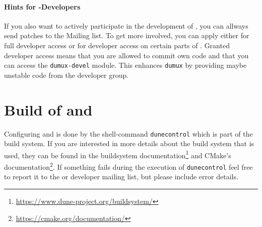 %
%
%
%

\paragraph{Hints for \Dumux-Developers}
If you also want to actively participate in the development of \Dumux, you can allways send patches
to the Mailing list.
To get more involved, you can apply either for full developer
access or for developer access on certain parts of \Dumux. Granted developer access means that
you are allowed to commit own code and that you can access the \texttt{dumux-devel} module.
This enhances \texttt{dumux} by providing maybe unstable code from the developer group.

\section{Build of \Dune and \Dumux}
\label{buildIt}
Configuring \Dune and \Dumux is done by the shell-command \texttt{dunecontrol} which is part of the \Dune build system.
If you are interested in more details about the build system that is used,
they can be found in the \Dune buildsystem documentation\footnote{\url{https://www.dune-project.org/buildsystem/}} and
CMake's documentation\footnote{\url{https://cmake.org/documentation/}}.
If something fails during the execution of \texttt{dunecontrol} feel free to report it to the \Dune or \Dumux developer mailing list,
but please include error details.

